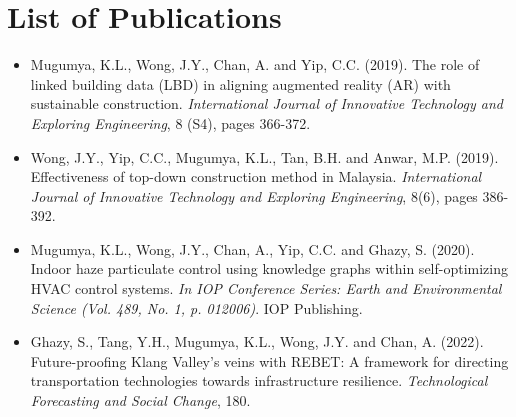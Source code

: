 \chapter*{List of Publications}

\begin{itemize}

    \item 
    Mugumya, K.L., Wong, J.Y., Chan, A. and Yip, C.C. (2019). The role of linked building data (LBD) in aligning augmented reality (AR) with sustainable construction. \textit{International Journal of Innovative Technology and Exploring Engineering}, 8 (S4), pages 366-372.
    
    \item 
    Wong, J.Y., Yip, C.C., Mugumya, K.L., Tan, B.H. and Anwar, M.P. (2019). Effectiveness of top-down construction method in Malaysia. \textit{International Journal of Innovative Technology and Exploring Engineering}, 8(6), pages 386-392.

    \item 
    Mugumya, K.L., Wong, J.Y., Chan, A., Yip, C.C. and Ghazy, S. (2020). Indoor haze particulate control using knowledge graphs within self-optimizing HVAC control systems. \textit{In IOP Conference Series: Earth and Environmental Science (Vol. 489, No. 1, p. 012006)}. IOP Publishing.

    \item 
    Ghazy, S., Tang, Y.H., Mugumya, K.L., Wong, J.Y. and Chan, A. (2022). Future-proofing Klang Valley’s veins with REBET: A framework for directing transportation technologies towards infrastructure resilience. \textit{Technological Forecasting and Social Change}, 180.

\end{itemize}